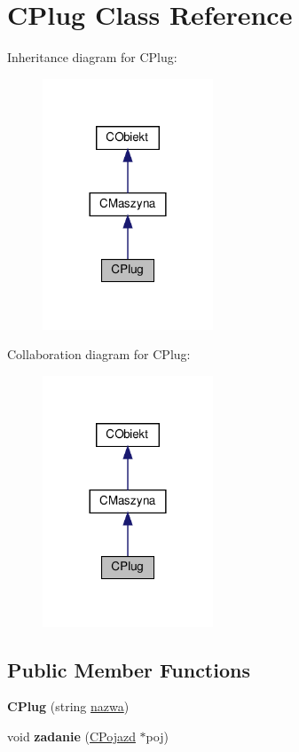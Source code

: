 \hypertarget{class_c_plug}{}\section{C\+Plug Class Reference}
\label{class_c_plug}


Inheritance diagram for C\+Plug\+:\nopagebreak
\begin{figure}[H]
\begin{center}
\leavevmode
\includegraphics[width=144pt]{class_c_plug__inherit__graph}
\end{center}
\end{figure}


Collaboration diagram for C\+Plug\+:\nopagebreak
\begin{figure}[H]
\begin{center}
\leavevmode
\includegraphics[width=144pt]{class_c_plug__coll__graph}
\end{center}
\end{figure}
\subsection*{Public Member Functions}
\begin{DoxyCompactItemize}
\item 
\mbox{\label{class_c_plug_a543e8784f908ab3c605ccd821160c152}} 
{\bfseries C\+Plug} (string \mbox{\hyperlink{class_c_obiekt_ac9ed13ef043c761cfb0f203a5732d75a}{nazwa}})
\item 
\mbox{\label{class_c_plug_ad51882adc76b4ad6bcfbc7464903f28d}} 
void {\bfseries zadanie} (\mbox{\hyperlink{class_c_pojazd}{C\+Pojazd}} $\ast$poj)
\end{DoxyCompactItemize}
